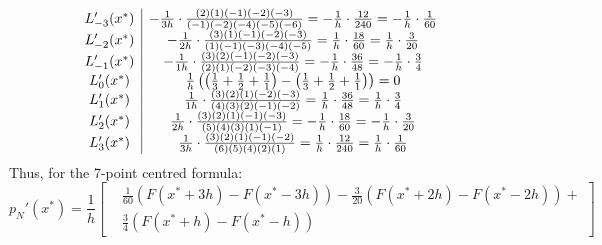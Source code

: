 \documentclass[10pt]{article} %
\begin{document}
\[
\begin{array}{c | c }
L'_{-3}(x^*)	&	-\frac{1}{3h} \cdot \frac{(2)(1)(-1)(-2)(-3)}{(-1)(-2)(-4)(-5)(-6)} = 	-\frac{1}{h} \cdot \frac{12}{240} = -\frac{1}{h} \cdot \frac{1}{60}\\
L'_{-2}(x^*)	&	-\frac{1}{2h} \cdot \frac{(3)(1)(-1)(-2)(-3)}{(1)(-1)(-3)(-4)(-5)}	= 	\frac{1}{h} \cdot \frac{18}{60} = \frac{1}{h} \cdot \frac{3}{20}\\
L'_{-1}(x^*)	&	-\frac{1}{1h} \cdot \frac{(3)(2)(-1)(-2)(-3)}{(2)(1)(-2)(-3)(-4)} = -\frac{1}{h} \cdot \frac{36}{48} = -\frac{1}{h} \cdot \frac{3}{4}\\
L'_{0}(x^*)	&	\frac{1}{h} \left( \left(\frac{1}{3} + \frac{1}{2} + \frac{1}{1}\right) - \left(\frac{1}{3} + \frac{1}{2} + \frac{1}{1}\right)\right) = 0\\
L'_{1}(x^*)	&	\frac{1}{1h} \cdot \frac{(3)(2)(1)(-2)(-3)}{(4)(3)(2)(-1)(-2)}	= \frac{1}{h} \cdot \frac{36}{48} = \frac{1}{h} \cdot \frac{3}{4}\\
L'_{2}(x^*)	&	\frac{1}{2h} \cdot \frac{(3)(2)(1)(-1)(-3)}{(5)(4)(3)(1)(-1)}	= 	-\frac{1}{h} \cdot \frac{18}{60} = -\frac{1}{h} \cdot \frac{3}{20}\\
L'_{3}(x^*)	&	\frac{1}{3h} \cdot \frac{(3)(2)(1)(-1)(-2)}{(6)(5)(4)(2)(1)} = \frac{1}{h} \cdot \frac{12}{240} = \frac{1}{h} \cdot \frac{1}{60}		
\end{array}
\]
Thus, for the 7-point centred formula:
\begin{equation}
	p_N'(x^*) = \frac{1}{h} \left[
	\begin{aligned}
	&\frac{1}{60}(F(x^* + 3h) - F(x^* - 3h)) - \frac{3}{20}(F(x^* + 2h) - F(x^* - 2h)) + \\
	&\frac{3}{4}(F(x^* + h) - F(x^* - h))
	\end{aligned}
	\right]
\end{equation}
\end{document}
